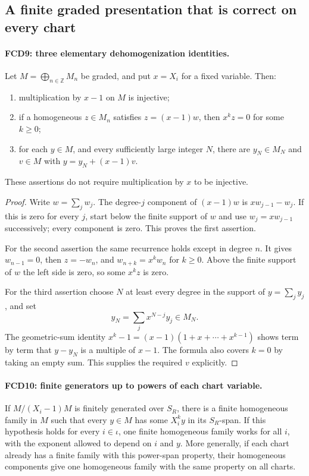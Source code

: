 \subsection{A finite graded presentation that is correct on every chart}

\paragraph{FCD9: three elementary dehomogenization identities.}
\label{claim:FCD9}
Let $M=\bigoplus_{n\in\mathbb Z}M_n$ be graded, and put
$x=X_i$ for a fixed variable.  Then:
\begin{enumerate}
\item multiplication by $x-1$ on $M$ is injective;
\item if a homogeneous $z\in M_n$ satisfies $z=(x-1)w$,
then $x^kz=0$ for some $k\ge0$;
\item for each $y\in M$, and every sufficiently large integer $N$,
there are $y_N\in M_N$ and $v\in M$ with $y=y_N+(x-1)v$.
\end{enumerate}
These assertions do not require multiplication by $x$ to be injective.

\begin{proof}
Write $w=\sum_jw_j$.  The degree-$j$ component of $(x-1)w$
is $xw_{j-1}-w_j$.  If this is zero for every $j$, start below
the finite support of $w$ and use $w_j=xw_{j-1}$ successively;
every component is zero.  This proves the first assertion.

For the second assertion the same recurrence holds except in degree
$n$.  It gives $w_{n-1}=0$, then $z=-w_n$, and
$w_{n+k}=x^kw_n$ for $k\ge0$.  Above the finite support of
$w$ the left side is zero, so some $x^kz$ is zero.

For the third assertion choose $N$ at least every degree in the
support of $y=\sum_jy_j$, and set
\[
 y_N=\sum_j x^{N-j}y_j\in M_N.
\]
The geometric-sum identity
$x^k-1=(x-1)(1+x+\cdots+x^{k-1})$ shows term by term that
$y-y_N$ is a multiple of $x-1$.  The formula also covers $k=0$
by taking an empty sum.  This supplies the required $v$ explicitly.
\end{proof}

\paragraph{FCD10: finite generators up to powers of each chart variable.}
\label{claim:FCD10}
If $M/(X_i-1)M$ is finitely generated over $S_R$, there is a
finite homogeneous family in $M$ such that every $y\in M$ has
some $X_i^ky$ in its $S_R$-span.  If this hypothesis holds for
every $i\in\iota$, one finite homogeneous family works for
all $i$, with the exponent allowed to depend on $i$ and $y$.
More generally, if each chart already has a finite family with
this power-span property, their homogeneous components give one
homogeneous family with the same property on all charts.

